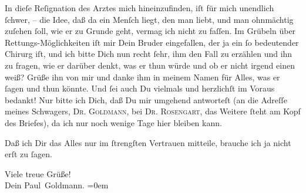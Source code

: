 \pstart
           In dieſe Reſignation des Arztes {\pb}mich hineinzufinden, iſt für mich
               unendlich ſchwer, – die Idee, daß da ein Menſch liegt, den man liebt, und man  ohnmächtig zuſehen ſoll, wie er zu Grunde geht, vermag ich nicht zu faſſen. Im
               Grübeln über Rettungs-Möglichkeiten iſt mir Dein Bruder eingefallen, der ja ein ſo bedeutender Chirurg iſt,
               und ich bitte Dich nun recht ſehr, ihm  den Fall zu erzählen und ihn zu fragen, wie er darüber denkt, was er thun
               würde und ob er nicht irgend einen \label{K_L03243-3v}\label{K_L03243-3} weiß? Grüße ihn von mir und danke ihm in meinem Namen für Alles, was er ſagen
               und thun könnte. Und ſei auch Du vielmals und {\pb}herzlichſt im Voraus bedankt! Nur bitte ich Dich, daß Du mir umgehend antworteſt
               (an die Adreſſe meines Schwagers, \textsc{Dr. Goldmann}, bei \textsc{Dr. }{ }\textsc{Rosengart}, das Weitere ſteht am Kopf des Briefes), da ich nur noch wenige Tage hier bleiben kann.\pend
           
\pstart
           Daß ich Dir das Alles nur im ſtrengſten Vertrauen mitteile, brauche ich ja nicht erſt
               zu ſagen.\pend
           
\pstart
           Viele treue Grüße! {\\[\baselineskip]}Dein \spacefill\mbox{Paul Goldmann.}\pend
           \leftskip=0em{}\endnumbering{}  
      